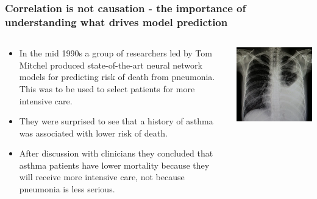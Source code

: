 \begin{frame}
\frametitle{Correlation is not causation - the importance of understanding what drives model prediction}
\begin{columns}
    \begin{column}{0.67\textwidth}
        \begin{itemize}
            \item In the mid 1990s a group of researchers led by Tom Mitchel produced state-of-the-art neural network models for predicting risk of death from pneumonia. This was to be used to select patients for more intensive care.
            \item They were surprised to see that a history of asthma was associated with lower risk of death.
            \item After discussion with clinicians they concluded that asthma patients have lower mortality because they will receive more intensive care, not because pneumonia is less serious.
        \end{itemize}
    \end{column}
    \begin{column}{0.3\textwidth}
        \includegraphics[width=1\textwidth]{./misc_images/pneumonia.png}
    \end{column}
\end{columns}
\end{frame}